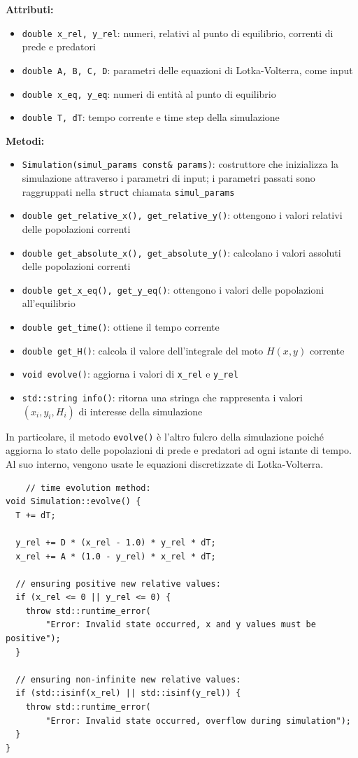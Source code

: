 \vspace{1cm}
\textbf{Attributi:}
\begin{itemize}
    \item \verb|double x_rel, y_rel|: numeri, relativi al punto di equilibrio, correnti di prede e predatori
    \item \verb|double A, B, C, D|: parametri delle equazioni di Lotka-Volterra, come input
    \item \verb|double x_eq, y_eq|: numeri di entità al punto di equilibrio
    \item \verb|double T, dT|: tempo corrente e time step della simulazione
\end{itemize}
\textbf{Metodi:}
\begin{itemize}
    \item \verb|Simulation(simul_params const& params)|: costruttore che inizializza la simulazione attraverso i parametri di input; i parametri passati sono raggruppati nella \verb|struct| chiamata \verb|simul_params|
    \item \verb|double get_relative_x(), get_relative_y()|: ottengono i valori relativi delle popolazioni correnti
    \item \verb|double get_absolute_x(), get_absolute_y()|: calcolano i valori assoluti delle popolazioni correnti
    \item \verb|double get_x_eq(), get_y_eq()|: ottengono i valori delle popolazioni all'equilibrio
    \item \verb|double get_time()|: ottiene il tempo corrente
    \item \verb|double get_H()|: calcola il valore dell'integrale del moto $H(x,y)$ corrente
    \item \verb|void evolve()|: aggiorna i valori di \verb|x_rel| e \verb|y_rel|
    \item \verb|std::string info()|: ritorna una stringa che rappresenta i valori $(x_i, y_i, H_i)$ di interesse della simulazione
\end{itemize}

In particolare, il metodo \verb|evolve()| è l'altro fulcro della simulazione poiché aggiorna lo stato delle popolazioni di prede e predatori ad ogni istante di tempo. Al suo interno, vengono usate le equazioni discretizzate di Lotka-Volterra.

\begin{verbatim}
    // time evolution method:
void Simulation::evolve() {
  T += dT;

  y_rel += D * (x_rel - 1.0) * y_rel * dT;
  x_rel += A * (1.0 - y_rel) * x_rel * dT;

  // ensuring positive new relative values:
  if (x_rel <= 0 || y_rel <= 0) {
    throw std::runtime_error(
        "Error: Invalid state occurred, x and y values must be positive");
  }

  // ensuring non-infinite new relative values:
  if (std::isinf(x_rel) || std::isinf(y_rel)) {
    throw std::runtime_error(
        "Error: Invalid state occurred, overflow during simulation");
  }
}
\end{verbatim}

